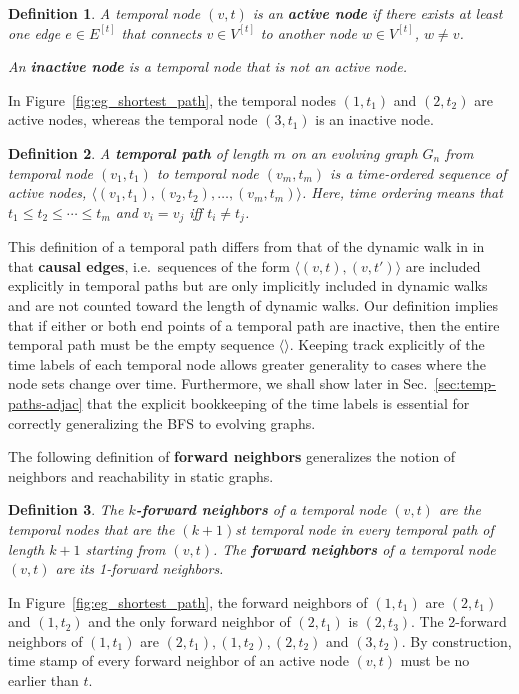 \documentclass[10pt,conference,compsocconf]{IEEEtran}
\newtheorem{defn}{Definition}
\theoremstyle{definition}
\begin{document}
\begin{defn}
A temporal node $(v,t)$ is an \textbf{active node} if there exists at least one
edge $e\in E^{[t]}$ that connects $v\in V^{[t]}$ to another node $w\in V^{[t]}$,
$w\ne v$.

An \textbf{inactive node} is a temporal node that is not an active node.
\end{defn}

In Figure~\ref{fig:eg_shortest_path}, the temporal nodes $(1,t_1)$ and $(2,t_2)$
are active nodes, whereas the temporal node $(3,t_1)$ is an inactive node.


\begin{defn}
A \textbf{temporal path} of length $m$ on an evolving graph $G_n$
from temporal node $(v_1, t_1)$ to temporal node $(v_m, t_m)$ is
a time-ordered sequence of active nodes,
$\langle (v_1, t_1), (v_2, t_2), \ldots, (v_m, t_m) \rangle$.
Here, time ordering means that $t_1 \leq t_2 \leq \cdots \leq t_m$ and
$v_i = v_j$ iff $t_i \ne t_j$.
\end{defn}

This definition of a temporal path differs from that of the dynamic walk
in \cite{gphe11,grihig13} in that \textbf{causal edges}, i.e.\ sequences of the
form $\langle (v, t), (v, t\prime)\rangle$ are included explicitly in temporal
paths but are only implicitly included in dynamic walks and are not counted
toward the length of dynamic walks.
Our definition implies that if either or both end points of a temporal
path are inactive, then the entire temporal path must be the empty sequence
$\langle \rangle$. Keeping track explicitly of the time labels of each temporal
node allows greater generality to cases where the node sets change over time.
Furthermore, we shall show later in Sec.~\ref{sec:temp-paths-adjac}
that the explicit bookkeeping of the time labels is essential for correctly
generalizing the BFS to evolving graphs.


The following definition of \textbf{forward neighbors} generalizes the notion of
neighbors and reachability in static graphs.


\begin{defn}
The \textbf{$k$-forward neighbors} of a temporal node $(v, t)$ are the temporal nodes
that are the $(k+1)$st temporal node in every temporal path of length $k+1$ starting
from $(v, t)$. The \textbf{forward neighbors} of a temporal node $(v, t)$ are its
1-forward neighbors.
\end{defn}

In Figure~\ref{fig:eg_shortest_path},
the forward neighbors of $(1, t_1)$ are $(2, t_1)$ and $(1, t_2)$ and
the only forward neighbor of $(2, t_1)$ is $(2, t_3)$.
The 2-forward neighbors of $(1, t_1)$ are
$(2, t_1), (1, t_2), (2, t_2)$ and $(3, t_2)$.
By construction, time stamp of every forward neighbor of an active node $(v, t)$
must be no earlier than $t$.
\end{document}

